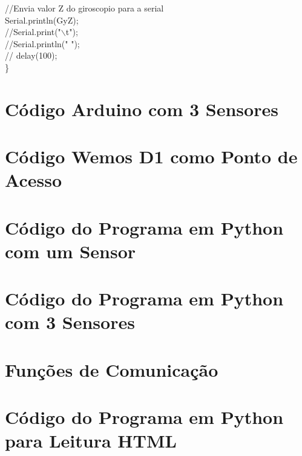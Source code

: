 \begin{apendicesenv}
//Envia valor Z do giroscopio para a serial\\ 
Serial.println(GyZ);\\
//Serial.print("$\backslash$t");\\
//Serial.println(" ");\\
// delay(100);\\

\}\\
\chapter {Código Arduino com 3 Sensores}
\footnotesize
 

\chapter {Código Wemos D1 como Ponto de Acesso}
\footnotesize
 

\chapter{Código do Programa em Python com um Sensor}
\footnotesize
 
\chapter{Código do Programa em Python com 3 Sensores}
\footnotesize
 
\chapter{Funções de Comunicação}
\footnotesize
 

\chapter{Código do Programa em Python para Leitura HTML}
\footnotesize


\end{apendicesenv}
